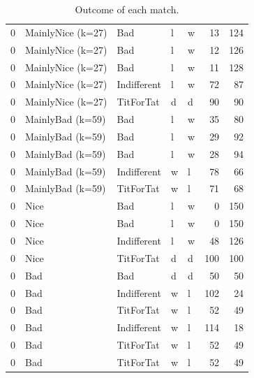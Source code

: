 \documentclass[journal,a4paper,10pt,twoside]{IEEEtran}
\begin{document}
\begin{table}[]
\begin{tabular}{lllllrr}
    0 &  MainlyNice (k=27) &                Bad &         l &         w &        13 &       124 \\
    0 &  MainlyNice (k=27) &                Bad &         l &         w &        12 &       126 \\
    0 &  MainlyNice (k=27) &                Bad &         l &         w &        11 &       128 \\
    0 &  MainlyNice (k=27) &        Indifferent &         l &         w &        72 &        87 \\
    0 &  MainlyNice (k=27) &          TitForTat &         d &         d &        90 &        90 \\
    0 &   MainlyBad (k=59) &                Bad &         l &         w &        35 &        80 \\
    0 &   MainlyBad (k=59) &                Bad &         l &         w &        29 &        92 \\
    0 &   MainlyBad (k=59) &                Bad &         l &         w &        28 &        94 \\
    0 &   MainlyBad (k=59) &        Indifferent &         w &         l &        78 &        66 \\
    0 &   MainlyBad (k=59) &          TitForTat &         w &         l &        71 &        68 \\
    0 &               Nice &                Bad &         l &         w &         0 &       150 \\
    0 &               Nice &                Bad &         l &         w &         0 &       150 \\
    0 &               Nice &        Indifferent &         l &         w &        48 &       126 \\
    0 &               Nice &          TitForTat &         d &         d &       100 &       100 \\
    0 &                Bad &                Bad &         d &         d &        50 &        50 \\
    0 &                Bad &        Indifferent &         w &         l &       102 &        24 \\
    0 &                Bad &          TitForTat &         w &         l &        52 &        49 \\
    0 &                Bad &        Indifferent &         w &         l &       114 &        18 \\
    0 &                Bad &          TitForTat &         w &         l &        52 &        49 \\
    0 &                Bad &          TitForTat &         w &         l &        52 &        49 \\
    \bottomrule
    \end{tabular}
    \caption{Outcome of each match.}
    \label{tab:match_df}
\end{table}
\end{document}
